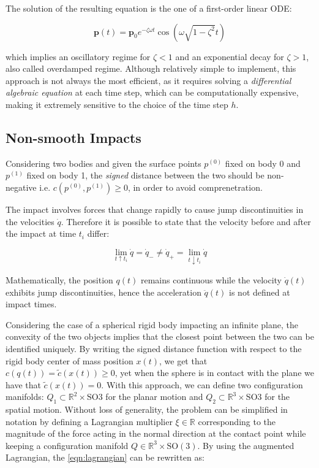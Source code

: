 The solution of the resulting equation is the one of a first-order linear \ac{ODE}:

\begin{equation}
    \mathbf{p}(t) = \mathbf{p}_0 e^{-\zeta \omega t} \cos(\omega \sqrt{1 - \zeta ^2} t)
\end{equation}

which implies an oscillatory regime for $\zeta < 1$ and an exponential decay for $\zeta > 1$, also called overdamped regime.
Although relatively simple to implement, this approach is not always the most efficient, as it requires solving a \textit{differential algebraic equation} at each time step, which can be computationally expensive, making it extremely sensitive to the choice of the time step $h$.

\subsection{Non-smooth Impacts}

Considering two bodies and given the surface points $p ^{(0)}$ fixed on body 0 and $p ^{(1)}$ fixed on body 1, the \textit{signed} distance between the two should be non-negative i.e. $c(p ^{(0)}, p ^{(1)}) \geq 0$, in order to avoid comprenetration.

The impact involves forces that change rapidly to cause jump discontinuities in the velocities $\dot{q}$. Therefore it is possible to state that the velocity before and after the impact at time $t_i$ differ:

\begin{equation}
    \lim _{t \uparrow t _i} \dot{q} = \dot{q} _{-} \neq \dot{q} _{+} = \lim _{t \downarrow t _i} \dot{q}
\end{equation}

Mathematically, the position $q(t)$ remains continuous while the velocity $\dot{q}(t)$ exhibits jump discontinuities, hence the acceleration $\ddot{q}(t)$ is not defined at impact times.

Considering the case of a spherical rigid body impacting an infinite plane, the convexity of the two objects implies that the closest point between the two can be identified uniquely. By writing the signed distance function with respect to the rigid body center of mass position $x(t)$, we get that $c(q(t)) = \tilde{c}(x(t)) \geq 0$, yet when the sphere is in contact with the plane we have that $\tilde{c}(x(t)) = 0$. With this approach, we can define two configuration manifolds: $Q _1 \subset \mathbb{R} ^2 \times \mathrm{SO}3$ for the planar motion and $Q _2 \subset \mathbb{R} ^3 \times \mathrm{SO}3$ for the spatial motion. Without loss of generality, the problem can be simplified in notation by defining a Lagrangian multiplier $\xi \in \mathbb{R}$ corresponding to the magnitude of the force acting in the normal direction at the contact point while keeping a configuration manifold $Q \in \mathbb{R}^3 \times \mathrm{SO}(3)$.
By using the augmented Lagrangian, the \cref{eqn:lagrangian} can be rewritten as:

